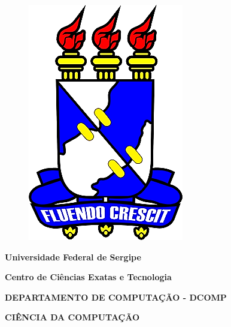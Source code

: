 \begin{figure}
\centering
\includegraphics[scale=0.5]{ufs.png}
\end{figure}

\bigskip


\bigskip


\bigskip


\bigskip


\bigskip


\bigskip


\bigskip


\bigskip


\bigskip

{\centering{}
\textbf{\textcolor[rgb]{0.078431375,0.09411765,0.13725491}{Universidade Federal de Sergipe}}
\par}

{\centering{}
\textbf{\textcolor[rgb]{0.078431375,0.09411765,0.13725491}{Centro de Ciências Exatas e Tecnologia}}
\par}

{\centering{}
\textbf{\textcolor[rgb]{0.078431375,0.09411765,0.13725491}{DEPARTAMENTO DE COMPUTAÇÃO - DCOMP}}
\par}

{\centering{}
\textbf{\textcolor[rgb]{0.078431375,0.09411765,0.13725491}{CIÊNCIA DA COMPUTAÇÃO}}
\par}


\bigskip


\bigskip


\bigskip



